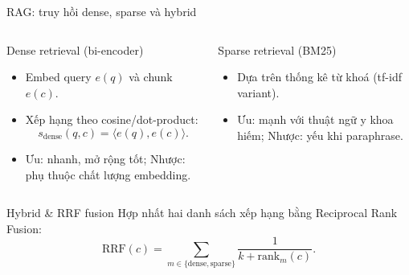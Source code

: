 \documentclass[aspectratio=169,10pt]{beamer}
\begin{document}
\begin{frame}{RAG: truy hồi dense, sparse và hybrid}
\small
\begin{columns}[T,onlytextwidth]
\begin{block}{Dense retrieval (bi-encoder)}
\begin{itemize}
  \item Embed query \(e(q)\) và chunk \(e(c)\).
  \item Xếp hạng theo cosine/dot-product:
  \[
  s_{\text{dense}}(q,c)=\langle e(q), e(c)\rangle.
  \]
  \item Ưu: nhanh, mở rộng tốt; Nhược: phụ thuộc chất lượng embedding.
\end{itemize}
\end{block}

\begin{block}{Sparse retrieval (BM25)}
\begin{itemize}
  \item Dựa trên thống kê từ khoá (tf-idf variant).
  \item Ưu: mạnh với thuật ngữ y khoa hiếm; Nhược: yếu khi paraphrase.
\end{itemize}
\end{block}
\end{columns}

\vspace{0.15cm}
\begin{block}{Hybrid \& RRF fusion}
Hợp nhất hai danh sách xếp hạng bằng Reciprocal Rank Fusion:
\[
\text{RRF}(c)=\sum_{m\in\{\text{dense},\text{sparse}\}}\frac{1}{k+\text{rank}_m(c)}.
\]
\end{block}
\end{frame}
\end{document}
